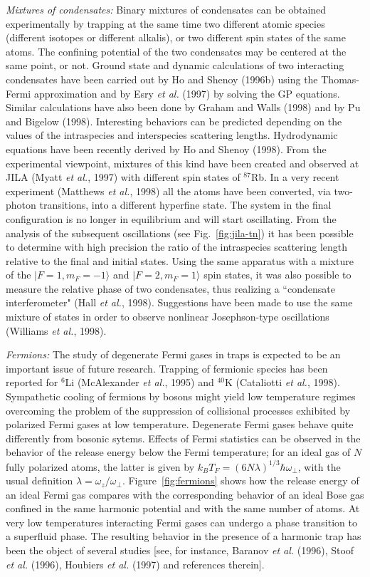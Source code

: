 {\it Mixtures of condensates:}  Binary  mixtures of condensates can
be obtained experimentally by trapping at the same time two different
atomic species (different isotopes or different alkalis), or two 
different spin states of the same atoms. The confining potential
of the two condensates may be centered at the same point,  or not.
Ground state and dynamic calculations of two interacting condensates
have been carried out by Ho and Shenoy (1996b) using the Thomas-Fermi
approximation and by Esry {\it et al.} (1997) by solving the GP 
equations.  Similar calculations have also been  done by Graham 
and Walls (1998) and by Pu and Bigelow (1998). Interesting behaviors 
can be  predicted depending on the values of the intraspecies and 
interspecies scattering lengths. Hydrodynamic equations have been 
recently derived by Ho and Shenoy (1998). From the experimental 
viewpoint, mixtures of this kind have been created and 
observed at JILA (Myatt {\it et al.}, 1997) with different 
spin states of $^{87}$Rb. In a very recent experiment (Matthews 
{\it et al.}, 1998)  all the atoms  have been converted, via 
two-photon  transitions, into a different hyperfine state.  The 
system in the final configuration is no longer in equilibrium and 
will start oscillating. From the analysis of the subsequent oscillations 
(see Fig.~\ref{fig:jila-tn}) it has been possible to determine with 
high precision the ratio of the intraspecies scattering length relative 
to the final and initial states. Using the same apparatus with a
mixture of the $|F=1, m_F=-1 \rangle$ and $|F=2, m_F=1 \rangle$ spin
states, it was also possible to measure the relative phase of two 
condensates, thus realizing a  ``condensate interferometer" (Hall
{\it et al.}, 1998). Suggestions have been made to use the same 
mixture of states in order to observe nonlinear Josephson-type 
oscillations (Williams {\it et al.}, 1998).

{\it Fermions:} The study of degenerate Fermi gases in traps
is expected to be an important issue of future research. Trapping 
of fermionic species has been reported for $^6$Li (McAlexander {\it 
et al.}, 1995) and $^{40}$K (Cataliotti {\it et al.}, 1998). 
Sympathetic cooling of fermions by bosons might yield low temperature
regimes overcoming the problem of the  suppression of collisional
processes exhibited  by polarized Fermi gases at low
temperature. Degenerate Fermi gases behave quite differently from
bosonic sytems. Effects of Fermi statistics can be observed
in the behavior of  the release energy below the Fermi temperature;
for an ideal gas of $N$ fully polarized atoms, the latter is given by
$k_B T_{F}= (6 N \lambda)^{1/3} \hbar \omega_\perp$, with the
usual definition  $\lambda=\omega_z/\omega_\perp$. 
Figure~\ref{fig:fermions} shows  how the release energy of an
ideal Fermi gas compares with the corresponding behavior of an ideal 
Bose gas confined in the same harmonic potential and with the same
number of atoms.  At very low temperatures interacting Fermi gases 
can undergo a phase  transition to a superfluid phase. The resulting
behavior in the presence of a harmonic trap  has been the object
of several studies [see, for instance, Baranov {\it et al.} (1996),
Stoof {\it et al.} (1996), Houbiers {\it et al.} (1997) and 
references therein].

